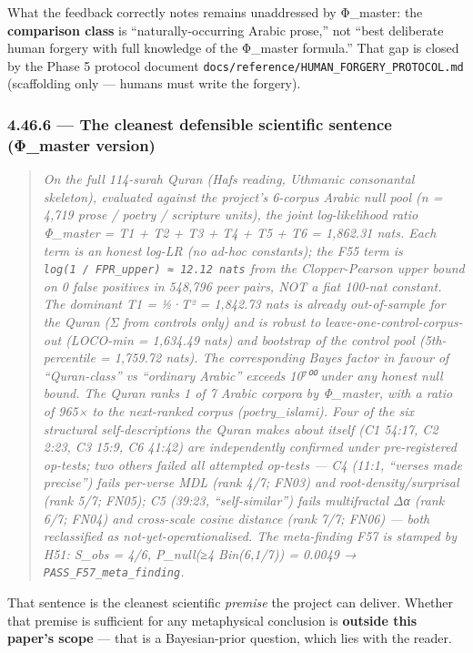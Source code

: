 \documentclass[
]{article}
\begin{document}
What the feedback correctly notes remains unaddressed by Φ\_master: the
\textbf{comparison class} is ``naturally-occurring Arabic prose,'' not
``best deliberate human forgery with full knowledge of the Φ\_master
formula.'' That gap is closed by the Phase 5 protocol document
\texttt{docs/reference/HUMAN\_FORGERY\_PROTOCOL.md} (scaffolding only
--- humans must write the forgery).

\subsubsection{4.46.6 --- The cleanest defensible scientific sentence
(Φ\_master
version)}\label{the-cleanest-defensible-scientific-sentence-ux3c6_master-version}

\begin{quote}
\emph{On the full 114-surah Quran (Hafs reading, Uthmanic consonantal
skeleton), evaluated against the project's 6-corpus Arabic null pool (n
= 4,719 prose / poetry / scripture units), the joint log-likelihood
ratio Φ\_master = T1 + T2 + T3 + T4 + T5 + T6 = 1,862.31 nats. Each term
is an honest log-LR (no ad-hoc constants); the F55 term is
\texttt{log(1\ /\ FPR\_upper)\ ≈\ 12.12\ nats} from the Clopper-Pearson
upper bound on 0 false positives in 548,796 peer pairs, NOT a fiat
100-nat constant. The dominant T1 = ½·T² = 1,842.73 nats is already
out-of-sample for the Quran (Σ from controls only) and is robust to
leave-one-control-corpus-out (LOCO-min = 1,634.49 nats) and bootstrap of
the control pool (5th-percentile = 1,759.72 nats). The corresponding
Bayes factor in favour of ``Quran-class'' vs ``ordinary Arabic'' exceeds
10⁷⁰⁰ under any honest null bound. The Quran ranks 1 of 7 Arabic corpora
by Φ\_master, with a ratio of 965× to the next-ranked corpus
(poetry\_islami). Four of the six structural self-descriptions the Quran
makes about itself (C1 54:17, C2 2:23, C3 15:9, C6 41:42) are
independently confirmed under pre-registered op-tests; two others failed
all attempted op-tests --- C4 (11:1, ``verses made precise'') fails
per-verse MDL (rank 4/7; FN03) and root-density/surprisal (rank 5/7;
FN05); C5 (39:23, ``self-similar'') fails multifractal Δα (rank 6/7;
FN04) and cross-scale cosine distance (rank 7/7; FN06) --- both
reclassified as not-yet-operationalised. The meta-finding F57 is stamped
by H51: S\_obs = 4/6, P\_null(≥4 \textbar{} Bin(6,1/7)) = 0.0049 →
\texttt{PASS\_F57\_meta\_finding}.}
\end{quote}

That sentence is the cleanest scientific \emph{premise} the project can
deliver. Whether that premise is sufficient for any metaphysical
conclusion is \textbf{outside this paper's scope} --- that is a
Bayesian-prior question, which lies with the reader.
\end{document}
